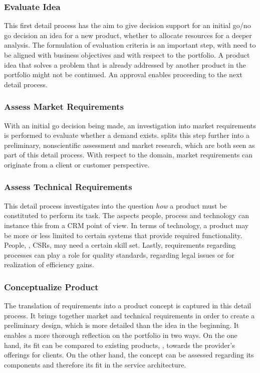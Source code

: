 	\subsubsection{Evaluate Idea}
	This first detail process has the aim to give decision support for an initial go/no go decision \wrt an idea for a new product, \ie whether to allocate resources for a deeper analysis. The formulation of evaluation criteria is an important step, with need to be aligned with business objectives and with respect to the portfolio. A product idea that solves a problem that is already addressed by another product in the portfolio might not be continued. An approval enables proceeding to the next detail process. 
	\subsubsection{Assess  Market Requirements}
	With an initial go decision being made, an investigation into market requirements is performed to evaluate whether a demand exists. \cite{Edgett_1996} splits this step further into a preliminary, nonscientific assessment and market research, which are both seen as part of this detail process. With respect to the domain, market requirements can originate from a client or customer perspective. 
	\subsubsection{Assess Technical Requirements}
	This detail process investigates into the question \textit{how} a product must be constituted to perform its task. The aspects people, process and technology can instance this from a \acrshort{CRM} point of view. In terms of technology, a product may be more or less limited to certain systems that provide required functionality. People, \ie, \acrshort{CSR}s, may need a certain skill set. Lastly, requirements regarding processes can play a role for quality standards, regarding legal issues or for realization of efficiency gains.
	
	\subsubsection{Conceptualize Product}
	The translation of requirements into a product concept is captured in this detail process. It brings together market  and technical requirements in order to create a preliminary design, which is more detailed than the idea in the beginning. It enables a more thorough reflection on the portfolio in two ways. On the one hand, its fit can be compared to existing products, \ie, towards the provider's offerings for clients. On the other hand, the concept can be assessed regarding its components and therefore its fit in the service architecture.
	

